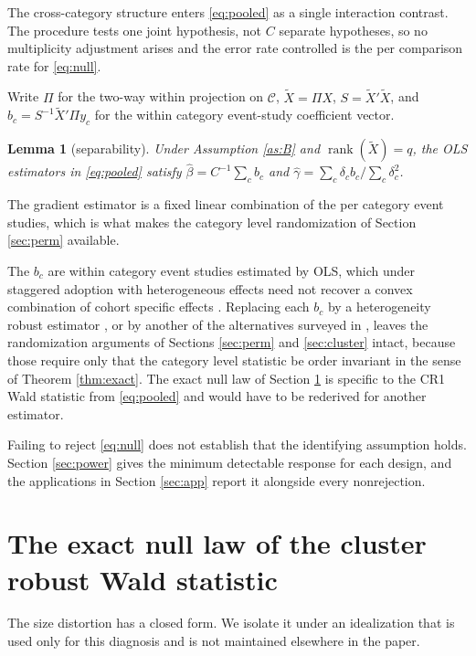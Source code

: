 \documentclass[12pt]{article}
\newtheorem{lemma}{Lemma}
\theoremstyle{definition}
\numberwithin{equation}{section}
\begin{document}
The cross-category structure enters \eqref{eq:pooled} as a single interaction
contrast. The procedure tests one joint hypothesis, not $C$ separate hypotheses,
so no multiplicity adjustment arises and the error rate controlled is the
per comparison rate for \eqref{eq:null}.

Write $\Pi$ for the two-way within projection on $\mathcal{C}$,
$\tilde{X} = \Pi X$, $S = \tilde{X}'\tilde{X}$, and $b_c = S^{-1}\tilde{X}'\Pi y_c$ for the
within category event-study coefficient vector.

\begin{lemma}[separability]
\label{lem:sep}
Under Assumption \ref{as:B} and $\operatorname{rank}(\tilde{X}) = q$, the OLS
estimators in \eqref{eq:pooled} satisfy $\hat{\beta} = C^{-1}\sum_c b_c$ and
$\hat{\gamma} = \sum_c \delta_c b_c / \sum_c \delta_c^2$.
\end{lemma}

The gradient estimator is a fixed linear combination of the per category event
studies, which is what makes the category level randomization of Section
\ref{sec:perm} available.

The $b_c$ are within category event studies estimated by OLS, which under
staggered adoption with heterogeneous effects need not recover a convex
combination of cohort specific effects
\citep{dechaisemartin2020twoway,sunabraham2021}. Replacing each $b_c$ by a
heterogeneity robust estimator \citep{callaway2021did,borusyak2024revisiting},
or by another of the alternatives surveyed in \citet{roth2023trending}, leaves
the randomization arguments of Sections \ref{sec:perm} and \ref{sec:cluster}
intact, because those require only that the category level statistic be
order invariant in the sense of Theorem \ref{thm:exact}. The exact null law of
Section \ref{sec:anatomy} is specific to the CR1 Wald statistic from
\eqref{eq:pooled} and would have to be rederived for another estimator.

Failing to reject \eqref{eq:null} does not establish that the identifying
assumption holds. Section \ref{sec:power} gives the minimum detectable response
for each design, and the applications in Section \ref{sec:app} report it
alongside every nonrejection.

\section{The exact null law of the cluster robust Wald statistic}
\label{sec:anatomy}

The size distortion has a closed form. We isolate it under an idealization that
is used only for this diagnosis and is not maintained elsewhere in the paper.
\end{document}
